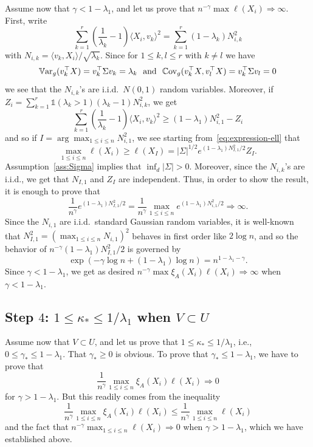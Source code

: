 \documentclass[]{article}
\newcommand{\Indicator}[1]{\mathds{1}\left(#1\right)}
\newcommand{\Var}{\mathbb{V}\text{\textnormal{ar}}}
\newcommand{\Cov}{\mathbb{C}\text{\textnormal{ov}}}
\theoremstyle{plain}
\theoremstyle{definition}
\begin{document}
Assume now that $\gamma < 1-\lambda_1$, and let us prove that $n^{-\gamma} \max \ell(X_i) \Rightarrow \infty$. First, write
\[ \sum_{k=1}^r \left( \frac{1}{\lambda_k} - 1 \right) \langle X_i, v_k \rangle^2 = \sum_{k=1}^r \left( 1 - \lambda_k \right) N_{i,k}^2 \]
with $N_{i,k} = \langle v_k, X_i \rangle / \sqrt{\lambda_k}$. Since for $1 \leq k, l \leq r$ with $k \neq l$ we have
\[ \Var_g(v_k^\top X) = v_k^\top \Sigma v_k = \lambda_k \ \text{ and } \ \Cov_g(v_k^\top X, v_l^\top X) = v_k^\top \Sigma v_l = 0 \]
we see that the $N_{i,k}$'s are i.i.d.\ $N(0,1)$ random variables. Moreover, if $Z_i = \sum_{k=1}^r \Indicator{\lambda_k > 1} (\lambda_k - 1) N_{i,k}^2$, we get
\[ \sum_{k=1}^r \left( \frac{1}{\lambda_k} - 1 \right) \langle X_i, v_k \rangle^2 \geq (1-\lambda_1) N_{i,1}^2 - Z_i \]
and so if $I = \arg \max_{1 \leq i \leq n} N_{i,1}^2$, we see starting from~\eqref{eq:expression-ell} that
\[ \max_{1 \leq i \leq n} \ell(X_i) \geq \ell(X_I) = \lvert \Sigma \rvert^{1/2} e^{(1-\lambda_1) N_{I,1}^2 / 2} Z_I. \]
Assumption~\ref{ass:Sigma} implies that $\inf_d \lvert \Sigma \rvert > 0$. Moreover, since the $N_{i,k}$'s are i.i.d., we get that $N_{I,1}$ and $Z_I$ are independent. Thus, in order to show the result, it is enough to prove that
\[ \frac{1}{n^\gamma} e^{(1-\lambda_1) N^2_{I,1} / 2} = \frac{1}{n^\gamma} \max_{1 \leq i \leq n} e^{(1-\lambda_1) N^2_{i,1} / 2} \Rightarrow \infty. \]
Since the $N_{i,1}$ are i.i.d.\ standard Gaussian random variables, it is well-known that $N^2_{I,1} = (\max_{1 \leq i \leq n} N_{i,1})^2$ behaves in first order like $2 \log n$, and so the behavior of $n^{-\gamma} (1-\lambda_1) N^2_{I,1} / 2$ is governed by
\[ \exp \left( - \gamma \log n + (1-\lambda_1) \log n \right) = n^{1-\lambda_1 - \gamma}. \]
Since $\gamma < 1-\lambda_1$, we get as desired $n^{-\gamma} \max \xi_A(X_i) \ell(X_i) \Rightarrow \infty$ when $\gamma < 1 - \lambda_1$.




\subsection{Step $4$: $1 \leq \kappa_* \leq 1/\lambda_1$ when $V \subset U$} \label{sub:step-4}

Assume now that $V \subset U$, and let us prove that $1 \leq \kappa_* \leq 1/\lambda_1$, i.e., $0 \leq \gamma_* \leq 1 - \lambda_1$. That $\gamma_* \geq 0$ is obvious. To prove that $\gamma_* \leq 1-\lambda_1$, we have to prove that
\[ \frac{1}{n^\gamma} \max_{1 \leq i \leq n} \xi_A(X_i) \ell(X_i) \Rightarrow 0 \]
for $\gamma > 1-\lambda_1$. But this readily comes from the inequality
\[ \frac{1}{n^\gamma} \max_{1 \leq i \leq n} \xi_A(X_i) \ell(X_i) \leq \frac{1}{n^\gamma} \max_{1 \leq i \leq n} \ell(X_i) \]
and the fact that $n^{-\gamma} \max_{1 \leq i \leq n} \ell(X_i) \Rightarrow 0$ when $\gamma > 1-\lambda_1$, which we have established above.
\end{document}
